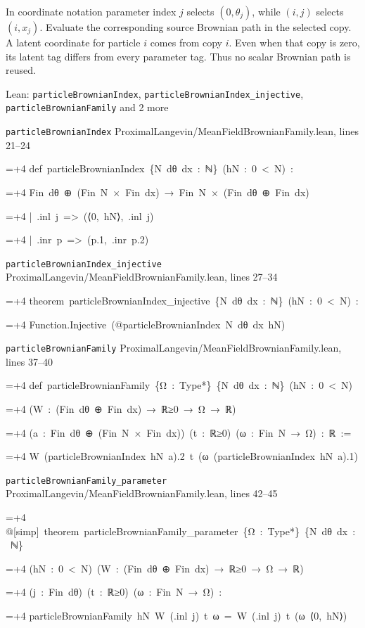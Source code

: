 \documentclass[11pt,a4paper]{report}
\newlength{\leancharwidth}
\newenvironment{leancode}{\par\smallskip\begingroup\ttfamily\footnotesize\raggedright
  \settowidth{\leancharwidth}{M}\setlength{\parskip}{0pt}\setlength{\parindent}{0pt}
  \frenchspacing}{\par\endgroup\smallskip}
\newcommand{\leanline}[2]{\hangindent=\dimexpr#1\leancharwidth+4\leancharwidth\relax
  \hangafter=1\noindent\hspace*{#1\leancharwidth}#2\par}
\newcommand{\leansource}[1]{\par{\footnotesize\color{leanmuted}#1}\par}
\begin{document}
In coordinate notation parameter index \(j\) selects \((0,\theta_j)\), while \((i,j)\) selects \((i,x_j)\). Evaluate the corresponding source Brownian path in the selected copy. A latent coordinate for particle \(i\) comes from copy \(i\). Even when that copy is zero, its latent tag differs from every parameter tag. Thus no scalar Brownian path is reused.

\begin{leanbox}{Lean: \texttt{particleBrownianIndex}, \texttt{particleBrownianIndex\_\allowbreak{}injective}, \texttt{particleBrownianFamily} and 2 more}
\leansource{\texttt{particleBrownianIndex} \quad ProximalLangevin/\allowbreak{}MeanFieldBrownianFamily.lean, lines 21–24}
\begin{leancode}
\leanline{0}{def\ particleBrownianIndex\ \{N\ dθ\ dx\ :\ ℕ\}\ (hN\ :\ 0\ <\ N)\ :}
\leanline{4}{Fin\ dθ\ ⊕\ (Fin\ N\ ×\ Fin\ dx)\ →\ Fin\ N\ ×\ (Fin\ dθ\ ⊕\ Fin\ dx)}
\leanline{2}{|\ .inl\ j\ =>\ (⟨0,\ hN⟩,\ .inl\ j)}
\leanline{2}{|\ .inr\ p\ =>\ (p.1,\ .inr\ p.2)}
\end{leancode}
\leansource{\texttt{particleBrownianIndex\_\allowbreak{}injective} \quad ProximalLangevin/\allowbreak{}MeanFieldBrownianFamily.lean, lines 27–34}
\begin{leancode}
\leanline{0}{theorem\ particleBrownianIndex\_injective\ \{N\ dθ\ dx\ :\ ℕ\}\ (hN\ :\ 0\ <\ N)\ :}
\leanline{4}{Function.Injective\ (@particleBrownianIndex\ N\ dθ\ dx\ hN)}
\end{leancode}
\leansource{\texttt{particleBrownianFamily} \quad ProximalLangevin/\allowbreak{}MeanFieldBrownianFamily.lean, lines 37–40}
\begin{leancode}
\leanline{0}{def\ particleBrownianFamily\ \{Ω\ :\ Type*\}\ \{N\ dθ\ dx\ :\ ℕ\}\ (hN\ :\ 0\ <\ N)}
\leanline{4}{(W\ :\ (Fin\ dθ\ ⊕\ Fin\ dx)\ →\ ℝ≥0\ →\ Ω\ →\ ℝ)}
\leanline{4}{(a\ :\ Fin\ dθ\ ⊕\ (Fin\ N\ ×\ Fin\ dx))\ (t\ :\ ℝ≥0)\ (ω\ :\ Fin\ N\ →\ Ω)\ :\ ℝ\ :=}
\leanline{2}{W\ (particleBrownianIndex\ hN\ a).2\ t\ (ω\ (particleBrownianIndex\ hN\ a).1)}
\end{leancode}
\leansource{\texttt{particleBrownianFamily\_\allowbreak{}parameter} \quad ProximalLangevin/\allowbreak{}MeanFieldBrownianFamily.lean, lines 42–45}
\begin{leancode}
\leanline{0}{@[simp]\ theorem\ particleBrownianFamily\_parameter\ \{Ω\ :\ Type*\}\ \{N\ dθ\ dx\ :\ ℕ\}}
\leanline{4}{(hN\ :\ 0\ <\ N)\ (W\ :\ (Fin\ dθ\ ⊕\ Fin\ dx)\ →\ ℝ≥0\ →\ Ω\ →\ ℝ)}
\leanline{4}{(j\ :\ Fin\ dθ)\ (t\ :\ ℝ≥0)\ (ω\ :\ Fin\ N\ →\ Ω)\ :}
\leanline{4}{particleBrownianFamily\ hN\ W\ (.inl\ j)\ t\ ω\ =\ W\ (.inl\ j)\ t\ (ω\ ⟨0,\ hN⟩)}

\end{leancode}
\end{leanbox}
\end{document}
